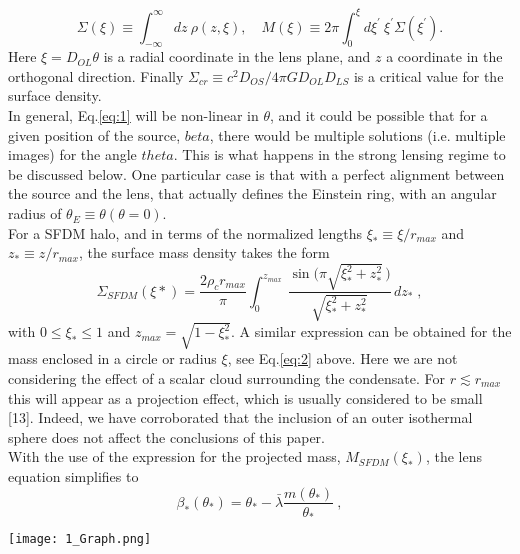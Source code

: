 \documentclass[letterpaper,10pt]{article}
\begin{document}
\begin{multicols}{2}
{\begin{equation}
\label{eq:2}
\Sigma(\xi) \equiv \int_{-\infty}^{\infty} dz\:\rho(z,\xi), \quad M(\xi)\equiv 2\pi \int_{0}^{\xi} d\xi^{\prime} \: \xi^{\prime} \Sigma(\xi^{\prime}).
\end{equation}
Here $\xi = D_{OL}\theta$ is a radial coordinate in the lens plane, and $z$ a coordinate in the orthogonal direction. Finally $\Sigma_{cr}\equiv c^2D_{OS}/4\pi GD_{OL}D_{LS}$ is a critical value for the surface density.
\\
In general, Eq.\eqref{eq:1} will be non-linear in $\theta$, and it could be possible that for a given position of the source, $beta$, there would be multiple solutions (i.e. multiple images) for the angle $theta$. This is what happens in the strong lensing regime to be discussed below. One particular case is that with a perfect alignment between the source and the lens, that actually defines the Einstein ring, with an angular radius of $\theta_{E} \equiv \theta(\theta=0)$.\\
For a SFDM halo, and in terms of the normalized lengths $\xi_{\ast} \equiv \xi/r_{max}$ and $z_{\ast} \equiv z/r_{max}$, the surface mass density takes the form
\begin{equation}
\label{eq:3}
\Sigma_{SFDM}(\xi\ast)=\frac{2\rho_c r_{max}}{\pi}  \int_{0}^{z_{max}} \, 
\frac{\sin{(\pi\sqrt{\xi_{\ast}^2+z_{\ast}^2}}\,)}{\sqrt{\xi_{\ast}^2+z_{\ast}^2}} \, dz_{\ast} \; ,
\end{equation}
with $0\leq \xi_{\ast} \leq 1$ and $z_{max}=\sqrt{1-\xi_{\ast}^2}$. A similar expression can be obtained for the mass enclosed in a circle or radius $\xi$, see Eq.\eqref{eq:2} above. Here we are not considering the effect of a scalar cloud surrounding the condensate. For $r\lesssim r_{max}$ this will appear as a projection effect, which is usually considered to be small [13]. Indeed, we have corroborated that the inclusion of an outer isothermal sphere does not affect the conclusions of this paper.\\
With the use of the expression for the projected mass, $M_{SFDM}(\xi_{\ast})$, the lens equation simplifies to
\\
\begin{equation}
\tag{5a}
\label{eq:4.a}
\beta_{\ast}(\theta_{\ast})= \theta_{\ast} -\bar{ \lambda} \frac{m(\theta_{\ast})}{\theta_{\ast}}  \: ,
\end{equation}
\begingroup
    \begin{center}
	\texttt{[image: 1\_Graph.png]} 
	\end{center}
    \label{FIG.1}
\endgroup

}
\end{multicols}
\end{document}
